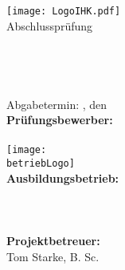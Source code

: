 \begin{titlepage}

\begin{center}
\texttt{[image: LogoIHK.pdf]}\\[1ex]
\Large{Abschlussprüfung \pruefungstermin}\\[3ex]

\Large{\ausbildungsberuf}\\
\LARGE{\betreff}\\[4ex]

\huge{\textbf{\titel}}\\[1.5ex]
\Large{\textbf{\untertitel}}\\[4ex]

\normalsize
Abgabetermin: \abgabeOrt, den \abgabeTermin\\[5ex]
\textbf{Prüfungsbewerber:}\\
\autorName\\[2ex]

\texttt{[image: \\betriebLogo]}\\[2ex]
\textbf{Ausbildungsbetrieb:}\\
\betriebName\\
\betriebAnschrift\\
\betriebOrt\\[2ex]
\textbf{Projektbetreuer:}\\
Tom Starke, B. Sc.
\end{center}

\end{titlepage}
\restoregeometry